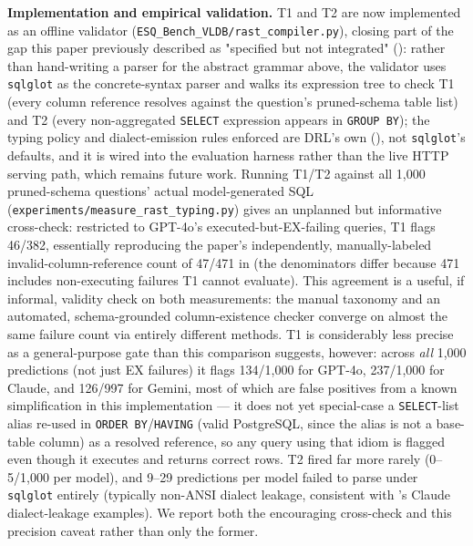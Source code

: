 \documentclass[twocolumn]{svjour3}
\begin{document}
\textbf{Implementation and empirical validation.} T1 and T2 are now implemented as an offline validator (\texttt{ESQ\_Bench\_VLDB/rast\_compiler.py}), closing part of the gap this paper previously described as "specified but not integrated" (): rather than hand-writing a parser for the abstract grammar above, the validator uses \texttt{sqlglot} as the concrete-syntax parser and walks its expression tree to check T1 (every column reference resolves against the question's pruned-schema table list) and T2 (every non-aggregated \texttt{SELECT} expression appears in \texttt{GROUP BY}); the typing policy and dialect-emission rules enforced are DRL's own (), not \texttt{sqlglot}'s defaults, and it is wired into the evaluation harness rather than the live HTTP serving path, which remains future work.
Running T1/T2 against all 1{,}000 pruned-schema questions' actual model-generated SQL (\texttt{experiments/measure\_rast\_typing.py}) gives an unplanned but informative cross-check: restricted to GPT-4o's executed-but-EX-failing queries, T1 flags 46/382, essentially reproducing the paper's independently, manually-labeled invalid-column-reference count of 47/471 in  (the denominators differ because 471 includes non-executing failures T1 cannot evaluate).
This agreement is a useful, if informal, validity check on both measurements: the manual taxonomy and an automated, schema-grounded column-existence checker converge on almost the same failure count via entirely different methods.
T1 is considerably less precise as a general-purpose gate than this comparison suggests, however: across \emph{all} 1{,}000 predictions (not just EX failures) it flags 134/1{,}000 for GPT-4o, 237/1{,}000 for Claude, and 126/997 for Gemini, most of which are false positives from a known simplification in this implementation --- it does not yet special-case a \texttt{SELECT}-list alias re-used in \texttt{ORDER BY}/\texttt{HAVING} (valid PostgreSQL, since the alias is not a base-table column) as a resolved reference, so any query using that idiom is flagged even though it executes and returns correct rows. T2 fired far more rarely (0--5/1{,}000 per model), and 9--29 predictions per model failed to parse under \texttt{sqlglot} entirely (typically non-ANSI dialect leakage, consistent with 's Claude dialect-leakage examples). We report both the encouraging cross-check and this precision caveat rather than only the former.

\end{document}
